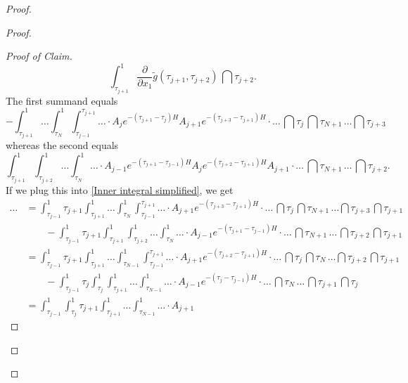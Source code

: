 \documentclass[a4paper, english, 12pt, bibliography=totocnumbered,
index=totoc]{scrartcl}
\begin{document}
\begin{proof}
\begin{proof}
\begin{proof}[Proof of Claim]
\begin{equation*}
				\int_{\tau_{j+1}}^1 \frac{\partial}{\partial x_1}
				\tilde{g}(\tau_{j+1}, \tau_{j+2}) \, \dint \tau_{j+2}.
			\end{equation*}
			The first summand equals
			\footnotesize
			\begin{equation*}
				-\int_{\tau_{j+1}}^1 \ldots \int_{\tau_{N}}^1
				\int_{\tau_{j-1}}^{\tau_{j+1}} \ldots \cdot A_j
				e^{-(\tau_{j+1} - \tau_{j})H} A_{j+1} e^{-(\tau_{j+3} -
					\tau_{j+1})H} \cdot \ldots \, \dint
				\tau_j \, \dint \tau_{N+1} \, \ldots
				\dint \tau_{j+3}
			\end{equation*}
			\normalsize
			whereas the second equals
			\footnotesize
			\begin{equation*}
				\int_{\tau_{j+1}}^1 \int_{\tau_{j+2}}^1 \ldots
				\int_{\tau_{N}}^1 \ldots \cdot A_{j-1}e^{-(\tau_{j+1} -
					\tau_{j-1})H} A_j e^{-(\tau_{j+2} - \tau_{j+1})H}A_{j+1}
				\cdot
				\ldots
				\, \dint \tau_{N+1} \, \ldots \, \dint \tau_{j+2}.
			\end{equation*}
			\normalsize
			If we plug this into \cref{Inner integral simplified}, we get
			\footnotesize
			\begin{align*}
				\ldots & = \int_{\tau_{j-1}}^1 \tau_{j+1}\int_{\tau_{j+1}}^1
				\ldots
				\int_{\tau_{N}}^1
				\int_{\tau_{j-1}}^{\tau_{j+1}} \ldots \cdot A_{j+1}
				e^{-(\tau_{j+3} -
					\tau_{j+1})H} \cdot \ldots \, \dint
				\tau_j \, \dint \tau_{N+1} \, \ldots
				\dint \tau_{j+3} \, \dint \tau_{j+1} \\
				& \qquad - \int_{\tau_{j-1}}^1 \tau_{j+1} \int_{\tau_{j+1}}^1
				\int_{\tau_{j+2}}^1 \ldots
				\int_{\tau_{N}}^1 \ldots \cdot A_{j-1}e^{-(\tau_{j+1} -
					\tau_{j-1})H} \cdot \ldots
				\, \dint \tau_{N+1} \, \ldots \, \dint \tau_{j+2} \, \dint
				\tau_{j+1} \\
				& = \int_{\tau_{j-1}}^1 \tau_{j+1}\int_{\tau_{j+1}}^1
				\ldots
				\int_{\tau_{N-1}}^1
				\int_{\tau_{j-1}}^{\tau_{j+1}} \ldots \cdot A_{j+1}
				e^{-(\tau_{j+2} -
					\tau_{j+1})H} \cdot \ldots \, \dint
				\tau_j \, \dint \tau_{N} \, \ldots
				\dint \tau_{j+2} \, \dint \tau_{j+1} \\
				& \qquad - \int_{\tau_{j-1}}^1 \tau_{j} \int_{\tau_{j}}^1
				\int_{\tau_{j+1}}^1 \ldots
				\int_{\tau_{N-1}}^1 \ldots \cdot A_{j-1}e^{-(\tau_{j} -
					\tau_{j-1})H} \cdot \ldots
				\, \dint \tau_{N} \, \ldots \, \dint \tau_{j+1} \, \dint
				\tau_{j} \\
				& = \int_{\tau_{j-1}}^1 \int_{\tau_j}^1
				\tau_{j+1}\int_{\tau_{j+1}}^1
				\ldots \int_{\tau_{N-1}}^1 \ldots \cdot A_{j+1}

\end{align*}
\end{proof}
\end{proof}
\end{proof}
\end{document}
